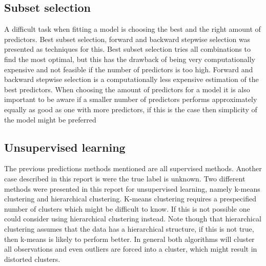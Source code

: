 \subsection{Subset selection}
A difficult task when fitting a model is choosing the best and the right amount of predictors. Best subset selection, forward and backward stepwise selection was presented as techniques for this. Best subset selection tries all combinations to find the most optimal, but this has the drawback of being very computationally expensive and not feasible if the number of predictors is too high. Forward and backward stepwise selection is a computationally less expensive estimation of the best predictors. When choosing the amount of predictors for a model it is also important to be aware if a smaller number of predictors performs approximately equally as good as one with more predictors, if this is the case then simplicity of the model might be preferred

\subsection{Unsupervised learning}
The previous predictions methods mentioned are all supervised methods. Another case described in this report is were the true label is unknown. Two different methods were presented in this report for unsupervised learning, namely k-means clustering and hierarchical clustering. K-means clustering requires a prespecified  number of clusters which might be difficult to know. If this is not possible one could consider using hierarchical clustering instead. Note though that hierarchical clustering assumes that the data has a hierarchical structure, if this is not true, then k-means is likely to perform better. In general both algorithms will cluster all observations and even outliers are forced into a cluster, which might result in distorted clusters.